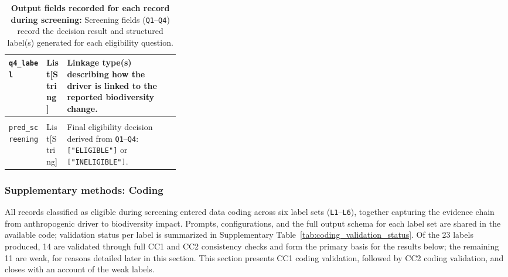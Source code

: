 \documentclass[12pt]{article}
\begin{document}
\begin{table}[H]
\begin{tabularx}{\linewidth}{|>{\raggedright\arraybackslash}p{0.22\linewidth}|>{\centering\arraybackslash}p{0.12\linewidth}|>{\raggedright\arraybackslash}X|}
\hline
\texttt{q4\_label} & List[String] & Linkage type(s) describing how the driver is linked to the reported biodiversity change. \\
\hline
\multicolumn{3}{|l|}{\textit{Eligibility decision}} \\
\hline
\texttt{pred\_screening} & List[String] & Final eligibility decision derived from \texttt{Q1}--\texttt{Q4}: \texttt{["ELIGIBLE"]} or \texttt{["INELIGIBLE"]}. \\
\hline
\end{tabularx}
\caption{\textbf{Output fields recorded for each record during screening:} Screening fields (\texttt{Q1}--\texttt{Q4}) record the decision result and structured label(s) generated for each eligibility question.}
\label{tab:screening_output_fields}
\end{table}


\newpage

\subsubsection*{Supplementary methods: Coding}
\label{smethods:coding}
All records classified as eligible during screening entered data coding across six label sets (\texttt{L1}--\texttt{L6}), together capturing the evidence chain from anthropogenic driver to biodiversity impact. Prompts, configurations, and the full output schema for each label set are shared in the available code; validation status per label is summarized in Supplementary Table~\ref{tab:coding_validation_status}. Of the 23 labels produced, 14 are validated through full CC1 and CC2 consistency checks and form the primary basis for the results below; the remaining 11 are weak, for reasons detailed later in this section. This section presents CC1 coding validation, followed by CC2 coding validation, and closes with an account of the weak labels.
\end{document}
